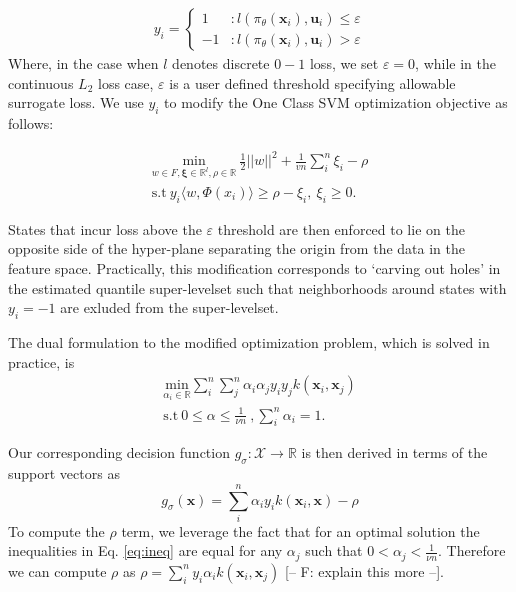 \documentclass[10pt, conference]{ieeeconf}      %
\newcommand{\bu}{\mathbf{u}}
\newcommand{\bx}{\mathbf{x}}
\begin{document}
\begin{align}
y_i = \left\{
     \begin{array}{lr}
         1 & : l(\pi_{\theta}(\bx_i),\bu_i)\le \varepsilon\\
         -1 & : l(\pi_{\theta}(\bx_i),\bu_i)>\varepsilon
     \end{array}
   \right.
\end{align}
Where, in the case when $l$ denotes discrete $0-1$ loss, we set $\varepsilon = 0$, while in the continuous $L_2$ loss
case, $\varepsilon$ is a user defined threshold specifying allowable surrogate loss.
We use $y_i$ to modify the One Class SVM optimization objective as follows: 

\vspace{-2ex}
\begin{align}\label{eq:primal_sup}
    \underset{w\in F, \mathbf{\xi} \in \mathbb{R}^l, \rho \in \mathbb{R}}{\mbox{min}}\: \frac{1}{2}||w||^2+\frac{1}{vn} \sum^n_i \xi_i - \rho\\
\mbox{s.t} \: y_i \langle w,\Phi(x_i)\rangle \geq \rho - \xi_i, \: \xi_i \geq 0 \label{eq:ineq}.
\end{align}

States that incur loss above the $\varepsilon$ threshold are then enforced to lie on the opposite side of the
hyper-plane separating the origin from the data in the feature space. Practically, this modification corresponds to
`carving out holes' in the estimated quantile super-levelset such that neighborhoods around states with $y_i=-1$ are
exluded from the super-levelset.

The dual formulation to the modified optimization problem, which is solved in practice, is 
\begin{align}\label{eq:dual_sup}
\underset{\alpha_i\in \mathbb{R}}{\mbox{min}} \sum_i^n \sum_j^n \alpha_i\alpha_j y_i y_jk(\bx_i,\bx_j)\\
\mbox{s.t} \: 0 \leq \alpha \leq \frac{1}{\nu n} \:, \sum_i^n \alpha_i = 1.
\end{align}

Our corresponding decision function $g_{\sigma}:\mathcal{X}\to \mathbb{R}$ is then derived in terms of the support vectors as $$g_{\sigma}(\bx) = \sum_i^n
\alpha_i y_i k(\bx_i,\bx) - \rho$$
To compute the $\rho$ term, we leverage the fact that for an optimal solution the
inequalities in Eq. \ref{eq:ineq} are equal for any $\alpha_j$ such that $0 < \alpha_j < \frac{1}{\nu n}$. Therefore we
can compute $\rho$ as  $\rho = \sum_i^n y_i \alpha_i k(\bx_i,\bx_j)$ \cite{scholkopf2001estimating} {\color{blue} [-- F:
explain this more --]}.
\end{document}
